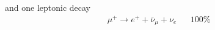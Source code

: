 and one leptonic decay\cite{pdg_2017}
\begin{align*}
\mu^+ \rightarrow e^+ + \bar{\nu}_\mu + \nu_e & & 100\%
\end{align*}

